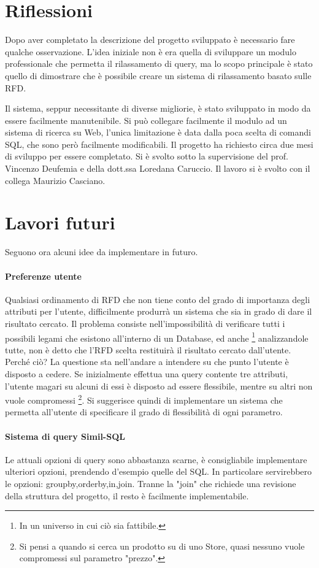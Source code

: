 \section{Riflessioni}
Dopo aver completato la descrizione del progetto sviluppato è necessario fare qualche osservazione.
L'idea iniziale non è era quella di sviluppare un modulo professionale che permetta il rilassamento di query, ma lo scopo principale è stato quello di dimostrare che è possibile creare un sistema di rilassamento basato sulle RFD.

Il sistema, seppur necessitante di diverse migliorie, è stato sviluppato in modo da essere facilmente manutenibile. 
Si può collegare facilmente il modulo ad un sistema di ricerca su Web, l'unica limitazione è data dalla poca scelta di comandi SQL, che sono però facilmente modificabili.
Il progetto ha richiesto circa due mesi di sviluppo per essere completato. Si è svolto sotto la supervisione del prof. Vincenzo Deufemia e della dott.ssa Loredana Caruccio. Il lavoro si è svolto con il collega Maurizio Casciano.

\section{Lavori futuri}
Seguono ora alcuni idee da implementare in futuro.
\paragraph{Preferenze utente}
Qualsiasi ordinamento di RFD che non tiene conto del grado di importanza degli attributi per l'utente, difficilmente produrrà un sistema che sia in grado di dare il risultato cercato.
Il problema consiste nell'impossibilità di verificare tutti i possibili legami che esistono all'interno di un Database, ed anche \footnote{In un universo in cui ciò sia fattibile.} analizzandole tutte, non è detto che l'RFD scelta restituirà il risultato cercato dall'utente. Perché ciò?
La questione sta nell'andare a intendere su che punto l'utente è disposto a cedere. Se inizialmente effettua una query contente tre attributi, l'utente magari su alcuni di essi è disposto ad essere flessibile, mentre su altri non vuole compromessi \footnote{Si pensi a quando si cerca un prodotto su di uno Store, quasi nessuno vuole compromessi sul parametro "prezzo".}.
Si suggerisce quindi di implementare un sistema che permetta all'utente di specificare il grado di flessibilità di ogni parametro.
\paragraph{Sistema di query Simil-SQL}
Le attuali opzioni di query sono abbastanza scarne, è consigliabile implementare ulteriori opzioni, prendendo d'esempio quelle del SQL. In particolare servirebbero le opzioni: groupby,orderby,in,join.
Tranne la "join" che richiede una revisione della struttura del progetto, il resto è facilmente implementabile.
